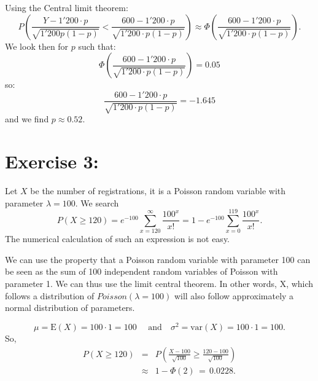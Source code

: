 \documentclass[12pt,thmsa]{article}\usepackage[]{graphicx}\usepackage[]{color}
\begin{document}
Using the Central limit theorem:
$$
P\left(\frac{Y-1'200\cdot p}{\sqrt{1'200p(1-p)}} < \frac{600 -
1'200\cdot p}{\sqrt{1'200\cdot p(1-p)}}\right) \approx \Phi\left(\frac{600 -
1'200\cdot p}{\sqrt{1'200\cdot p(1-p)}}\right).
$$
We look then for $p$ such that:
$$
\Phi\left(\frac{600 - 1'200\cdot p}{\sqrt{1'200\cdot p(1-p)}}\right) = 0.05
$$
so:
$$
\frac{600 - 1'200\cdot p}{\sqrt{1'200\cdot p(1-p)}} = -1.645
$$
and we find $p \approx 0.52.$




\section*{Exercise 3:}

Let $ X $ be the number of registrations, it is a Poisson random variable with parameter $ \lambda = 100 $. We search
$$
P(X \geq 120) = e^{-100}\sum_{x=120}^\infty \frac{100^x}{x!} = 1 -
e^{-100}\sum_{x=0}^{119} \frac{100^x}{x!}.
$$
The numerical calculation of such an expression is not easy.

We can use the property that a Poisson random variable with parameter 100 can be seen as the sum of 100 independent random variables of Poisson with parameter 1. We can thus use the limit central theorem. In other words, X, which follows a distribution of $Poisson(\lambda = 100)$ will also follow approximately a normal distribution of parameters.

$$
\mu = \text{E}(X) = 100 \cdot 1 = 100 \quad \mbox{ and} \quad \sigma^2 =
\text{var}(X) = 100 \cdot 1 =100.
$$
So,
\begin{eqnarray}
\nonumber P( X \geq 120) &=& P\left(\frac{X - 100}{\sqrt{100}} \geq
\frac{120 - 100}{\sqrt{100}}\right) \\
\nonumber &\approx& 1 - \Phi(2) \, = \,  0.0228.
\end{eqnarray}
\end{document}

